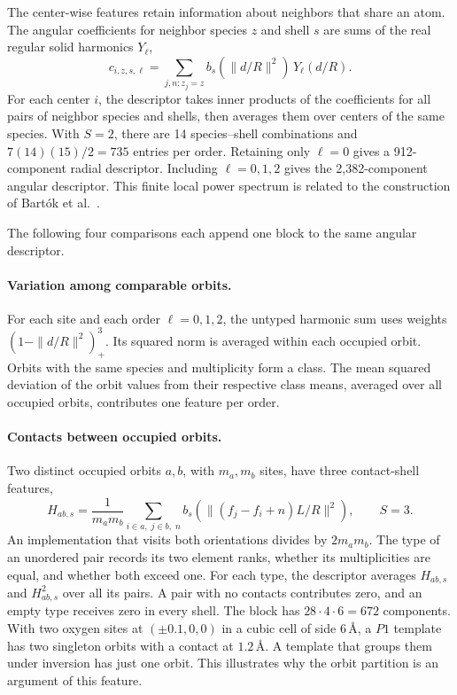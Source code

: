 The center-wise features retain information about neighbors that share an atom. The angular coefficients for neighbor species \(z\) and shell \(s\) are sums of the real regular solid harmonics \(Y_\ell\),
\[
 c_{i,z,s,\ell}=\sum_{j,n:z_j=z} b_s(\|d/R\|^2)\,Y_\ell(d/R).
\]
For each center \(i\), the descriptor takes inner products of the coefficients for all pairs of neighbor species and shells, then averages them over centers of the same species. With \(S=2\), there are 14 species--shell combinations and \(7(14)(15)/2=735\) entries per order. Retaining only \(\ell=0\) gives a 912-component radial descriptor. Including \(\ell=0,1,2\) gives the 2,382-component angular descriptor. This finite local power spectrum is related to the construction of Bart\'ok et al.~\cite{soap}.

The following four comparisons each append one block to the same angular descriptor.

\paragraph{Variation among comparable orbits.}
For each site and each order \(\ell=0,1,2\), the untyped harmonic sum uses weights \((1-\|d/R\|^2)_+^3\). Its squared norm is averaged within each occupied orbit. Orbits with the same species and multiplicity form a class. The mean squared deviation of the orbit values from their respective class means, averaged over all occupied orbits, contributes one feature per order.

\paragraph{Contacts between occupied orbits.}
Two distinct occupied orbits \(a,b\), with \(m_a,m_b\) sites, have three contact-shell features,
\[
 H_{ab,s}=\frac{1}{m_am_b}\sum_{i\in a,\;j\in b,\;n}
 b_s\!\left(\|(f_j-f_i+n)L/R\|^2\right),\qquad S=3 .
\]
An implementation that visits both orientations divides by \(2m_am_b\). The type of an unordered pair records its two element ranks, whether its multiplicities are equal, and whether both exceed one. For each type, the descriptor averages \(H_{ab,s}\) and \(H_{ab,s}^2\) over all its pairs. A pair with no contacts contributes zero, and an empty type receives zero in every shell. The block has \(28\cdot4\cdot6=672\) components. With two oxygen sites at \((\pm0.1,0,0)\) in a cubic cell of side \(6\,\text{\AA}\), a \(P1\) template has two singleton orbits with a contact at \(1.2\,\text{\AA}\). A template that groups them under inversion has just one orbit. This illustrates why the orbit partition is an argument of this feature.

